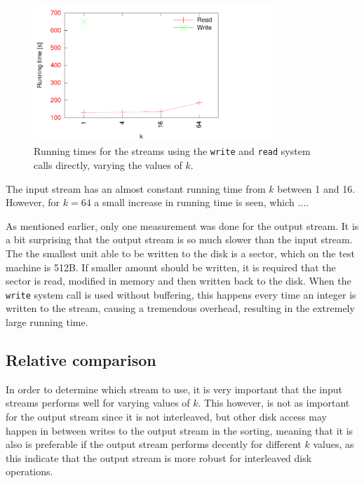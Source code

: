 \documentclass[a4paper,12pt]{article}
\begin{document}
\begin{figure}[h!]
  \centering
  \includegraphics[width=0.8\textwidth]{syscall_streams}
  \caption{Running times for the streams using the \texttt{write} and
    \texttt{read} system calls directly, varying the values of $k$.}
  \label{fig:syscall-streams}
\end{figure}

The input stream has an almost constant running time from $k$ between
1 and 16. However, for $k = 64$ a small increase in running time is
seen, which ....

As mentioned earlier, only one measurement was done for the output
stream. It is a bit surprising that the output stream is so much
slower than the input stream. The the smallest unit able to be written
to the disk is a sector, which on the test machine is
512B. If smaller amount should be written, it is
required that the sector is read, modified in memory and then written
back to the disk. When the \texttt{write} system call is used without
buffering, this happens every time an integer is written to the
stream, causing a tremendous overhead, resulting in the extremely
large running time.

\subsection{Relative comparison}
In order to determine which stream to use, it is very important that
the input streams performs well for varying values of $k$. This
however, is not as important for the output stream since it is not
interleaved, but other disk access may happen in between writes to the
output stream in the sorting, meaning that it is also is preferable if
the output stream performs decently for different $k$ values, as this
indicate that the output stream is more robust for interleaved disk
operations.
\end{document}
